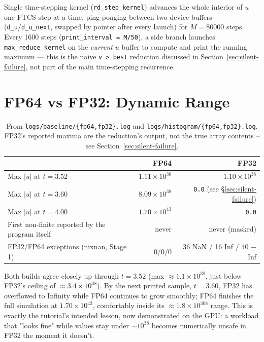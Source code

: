 \documentclass[11pt,a4paper]{article}
\begin{document}
\noindent Single time-stepping kernel (\texttt{rd\_step\_kernel}) advances the
whole interior of $u$ one FTCS step at a time, ping-ponging between two
device buffers (\texttt{d\_u}/\texttt{d\_u\_next}, swapped by pointer after
every launch) for $M{=}80000$ steps. Every 1600 steps
(\texttt{print\_interval\allowbreak{} = M/50}), a side branch launches
\texttt{max\_reduce\_kernel} on the
\emph{current} $u$ buffer to compute and print the running maximum --- this
is the naive \texttt{v > best} reduction discussed in
Section~\ref{sec:silent-failure}, not part of the main time-stepping
recurrence.

\section{FP64 vs FP32: Dynamic Range}
\label{sec:dynamic-range}

\begin{table}[ht]
\centering
\begin{tabular}{lrr}
\toprule
& FP64 & FP32 \\
\midrule
Max $|u|$ at $t=3.52$ & $1.11\times10^{38}$ & $1.10\times10^{38}$ \\
Max $|u|$ at $t=3.60$ & $8.09\times10^{38}$ & \texttt{0.0} (see \S\ref{sec:silent-failure}) \\
Max $|u|$ at $t=4.00$ & $1.70\times10^{43}$ & \texttt{0.0} \\
First non-finite reported by the program itself & never & never (masked) \\
FP32/FP64 exceptions (nixnan, Stage 1) & 0/0/0 & 36 NaN / 16 Inf / 40 $-$Inf \\
\bottomrule
\end{tabular}
\caption{From \texttt{logs/baseline/\{fp64,fp32\}.log} and
\texttt{logs/histogram/\{fp64,fp32\}.log}. FP32's reported maxima are the
reduction's output, not the true array contents -- see
Section~\ref{sec:silent-failure}.}
\label{tab:dynamic-range}
\end{table}

Both builds agree closely up through $t=3.52$ (max $\approx1.1\times10^{38}$,
just below FP32's ceiling of $\approx3.4\times10^{38}$). By the next printed
sample, $t=3.60$, FP32 has overflowed to Infinity while FP64 continues to
grow smoothly; FP64 finishes the full simulation at $1.70\times10^{43}$,
comfortably inside its $\approx1.8\times10^{308}$ range. This is exactly the
tutorial's intended lesson, now demonstrated on the GPU: a workload that
"looks fine" while values stay under $\sim10^{38}$ becomes numerically
unsafe in FP32 the moment it doesn't.
\end{document}
